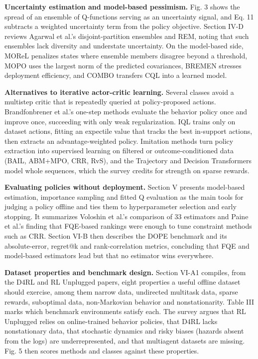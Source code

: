\documentclass[11pt]{article}
\begin{document}
\textbf{Uncertainty estimation and model-based pessimism.} Fig. 3 shows the spread of an ensemble of Q-functions serving as an uncertainty signal, and Eq. 11 subtracts a weighted uncertainty term from the policy objective. Section IV-D reviews Agarwal et al.'s disjoint-partition ensembles and REM, noting that such ensembles lack diversity and understate uncertainty. On the model-based side, MOReL penalizes states where ensemble members disagree beyond a threshold, MOPO uses the largest norm of the predicted covariances, BREMEN stresses deployment efficiency, and COMBO transfers CQL into a learned model.

\textbf{Alternatives to iterative actor-critic learning.} Several classes avoid a multistep critic that is repeatedly queried at policy-proposed actions. Brandfonbrener et al.'s one-step methods evaluate the behavior policy once and improve once, succeeding with only weak regularization. IQL trains only on dataset actions, fitting an expectile value that tracks the best in-support actions, then extracts an advantage-weighted policy. Imitation methods turn policy extraction into supervised learning on filtered or outcome-conditioned data (BAIL, ABM+MPO, CRR, RvS), and the Trajectory and Decision Transformers model whole sequences, which the survey credits for strength on sparse rewards.

\textbf{Evaluating policies without deployment.} Section V presents model-based estimation, importance sampling and fitted Q evaluation as the main tools for judging a policy offline and ties them to hyperparameter selection and early stopping. It summarizes Voloshin et al.'s comparison of 33 estimators and Paine et al.'s finding that FQE-based rankings were enough to tune constraint methods such as CRR. Section VI-B then describes the DOPE benchmark and its absolute-error, regret@k and rank-correlation metrics, concluding that FQE and model-based estimators lead but that no estimator wins everywhere.

\textbf{Dataset properties and benchmark design.} Section VI-A1 compiles, from the D4RL and RL Unplugged papers, eight properties a useful offline dataset should exercise, among them narrow data, undirected multitask data, sparse rewards, suboptimal data, non-Markovian behavior and nonstationarity. Table III marks which benchmark environments satisfy each. The survey argues that RL Unplugged relies on online-trained behavior policies, that D4RL lacks nonstationary data, that stochastic dynamics and risky biases (hazards absent from the logs) are underrepresented, and that multiagent datasets are missing. Fig. 5 then scores methods and classes against these properties.
\end{document}
